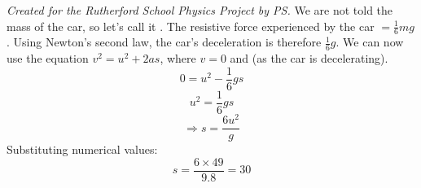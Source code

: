 
\begin{problem} 
{ 
}
{\textit{Created for the Rutherford School Physics Project by PS.}}
{We are not told the mass of the car, so let's call it . The resistive force experienced by the car $= \frac{1}{6}mg$. Using Newton's second law, the car's deceleration is therefore $\frac{1}{6}g$. We can now use the equation $v^2 = u^2 + 2as$, where $v = 0$ and (as the car is decelerating).
\begin{equation*}	0 = u^2 - \frac{1}{6}gs	\end{equation*}
\begin{equation*}	u^2 = \frac{1}{6}gs	\end{equation*}
\begin{equation*}	\Rightarrow s = \frac{6u^2}{g}	\end{equation*}
Substituting numerical values:
\begin{equation*}	s = \frac{6\times 49}{9.8} = 30	\end{equation*}
}
\end{problem}